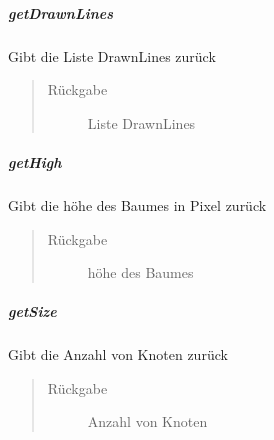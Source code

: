 \documentclass[letterpaper,10pt,ngerman]{sphinxmanual}
\begin{document}
\subparagraph{getDrawnLines}
\label{\detokenize{com/linuxluigi/edu/list/Listlabel:getdrawnlines}}

\begin{fulllineitems}
\label{\detokenize{com/linuxluigi/edu/list/Listlabel:com.linuxluigi.edu.list.Listlabel.getDrawnLines()}}
Gibt die Liste DrawnLines zurück
\begin{quote}\begin{description}
\item[{Rückgabe}] \leavevmode
Liste DrawnLines

\end{description}\end{quote}

\end{fulllineitems}



\subparagraph{getHigh}
\label{\detokenize{com/linuxluigi/edu/list/Listlabel:gethigh}}

\begin{fulllineitems}
\label{\detokenize{com/linuxluigi/edu/list/Listlabel:com.linuxluigi.edu.list.Listlabel.getHigh()}}
Gibt die höhe des Baumes in Pixel zurück
\begin{quote}\begin{description}
\item[{Rückgabe}] \leavevmode
höhe des Baumes

\end{description}\end{quote}

\end{fulllineitems}



\subparagraph{getSize}
\label{\detokenize{com/linuxluigi/edu/list/Listlabel:getsize}}

\begin{fulllineitems}
\label{\detokenize{com/linuxluigi/edu/list/Listlabel:com.linuxluigi.edu.list.Listlabel.getSize()}}
Gibt die Anzahl von Knoten zurück
\begin{quote}\begin{description}
\item[{Rückgabe}] \leavevmode
Anzahl von Knoten

\end{description}\end{quote}

\end{fulllineitems}
\end{document}
